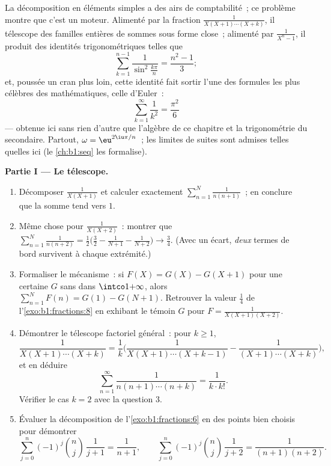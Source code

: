 \begin{problem}\label{pb:b1:fractions:1}
La décomposition en éléments simples a des airs de comptabilité~; ce
problème montre que c'est un moteur. Alimenté par la fraction
$\frac1{X(X+1)\cdots(X+k)}$, il télescope des familles entières de
sommes sous forme close~; alimenté par $\frac1{X^n - 1}$, il produit des
identités trigonométriques telles que
\[
\sum_{k=1}^{n-1}\frac{1}{\sin^2\frac{k\pi}{n}} = \frac{n^2-1}{3} ;
\]
et, poussée un cran plus loin, cette identité fait sortir l'une des
formules les plus célèbres des mathématiques, celle d'Euler~:
\[
\sum_{k=1}^{\infty}\frac1{k^2} = \frac{\pi^2}{6}
\]
--- obtenue ici sans rien d'autre que l'algèbre de ce chapitre et la
trigonométrie du secondaire.
Partout, $\omega = \eu^{2\iu\pi/n}$~; les limites de suites sont
admises telles quelles ici (le \cref{ch:b1:seq} les formalise).

\medskip
\noindent\textbf{Partie I --- Le télescope.}
\begin{enumerate}
  \item Décomposer $\frac1{X(X+1)}$ et calculer exactement
        $\sum_{n=1}^{N} \frac1{n(n+1)}$~; en conclure que la somme tend
        vers $1$.
  \item Même chose pour $\frac1{X(X+2)}$~: montrer que $\sum_{n=1}^{N}
        \frac1{n(n+2)} = \frac12\bigl(\frac32 - \frac1{N+1} -
        \frac1{N+2}\bigr) \to \frac34$. (Avec un écart, \emph{deux}
        termes de bord survivent à chaque extrémité.)
  \item Formaliser le mécanisme~: si $F(X) = G(X) - G(X+1)$ pour une
        certaine  $G$ sans  dans
        $\intco1{+\infty}$, alors $\sum_{n=1}^N F(n) = G(1) - G(N+1)$.
        Retrouver la valeur $\frac14$ de l'\cref{exo:b1:fractions:8} en
        exhibant le témoin $G$ pour $F = \frac1{X(X+1)(X+2)}$.
  \item Démontrer le télescope factoriel général~: pour $k \geq 1$,
        \[
        \frac{1}{X(X+1)\cdots(X+k)}
        = \frac1k\biggl(\frac{1}{X(X+1)\cdots(X+k-1)}
        - \frac{1}{(X+1)\cdots(X+k)}\biggr),
        \]
        et en déduire
        \[
        \sum_{n=1}^{\infty}\frac{1}{n(n+1)\cdots(n+k)}
        = \frac{1}{k \cdot k!} .
        \]
        Vérifier le cas $k = 2$ avec la question 3.
  \item Évaluer la décomposition de l'\cref{exo:b1:fractions:6} en des
        points bien choisis pour démontrer
        \[
        \sum_{j=0}^{n}(-1)^j\binom nj\,\frac1{j+1}
        = \frac1{n+1},
        \qquad
        \sum_{j=0}^{n}(-1)^j\binom nj\,\frac1{j+2}
        = \frac1{(n+1)(n+2)} .
        \]
\end{enumerate}


\end{problem}
